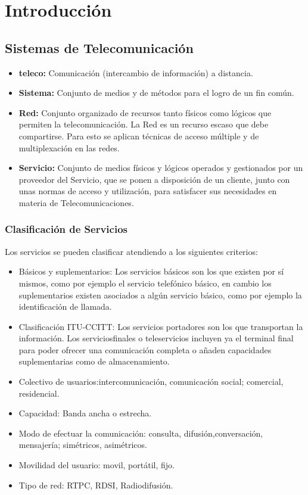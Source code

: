 \section{Introducción}
\subsection{Sistemas de Telecomunicación}
\begin{itemize}
\item\textbf{\Gls{teleco}:} Comunicación (intercambio de información) a distancia.
\item\textbf{\Gls{Sistema}:} Conjunto de medios y de métodos para el logro de un fin común.
\item\textbf{\Gls{Red}:} Conjunto organizado de recursos tanto físicos como lógicos que permiten la telecomunicación. La \gls{Red} es un recurso escaso que debe compartirse. Para esto se aplican técnicas de acceso múltiple y de multiplexación en las redes.
\item\textbf{\Gls{Servicio}:} Conjunto de medios físicos y lógicos operados y gestionados por un proveedor del \gls{Servicio}, que se ponen a disposición de un cliente, junto con unas normas de acceso y utilización, para satisfacer sus necesidades en materia de Telecomunicaciones.
\end{itemize}
\subsubsection{Clasificación de Servicios}
Los servicios se pueden clasificar atendiendo a los siguientes criterios:
\begin{itemize}
\item Básicos y suplementarios: Los servicios básicos son los que existen por sí mismos, como por ejemplo el servicio telefónico básico, en cambio los suplementarios existen asociados a algún servicio básico, como por ejemplo la identificación de llamada.
\item Clasificación \acrshort{ITU}-CCITT: Los servicios portadores son los que transportan la información. Los serviciosfinales o teleservicios incluyen ya el terminal final para poder ofrecer una comunicación completa o añaden capacidades suplementarias como de almacenamiento.
\item Colectivo de usuarios:intercomunicación, comunicación social; comercial, residencial.
\item Capacidad: Banda ancha o estrecha.
\item Modo de efectuar la comunicación: consulta, difusión,conversación, mensajería; simétricos, asimétricos.
\item Movilidad del usuario: movil, portátil, fijo.
\item Tipo de red: \acrshort{RTPC}, \acrshort{RDSI}, Radiodifusión.
\end{itemize}
